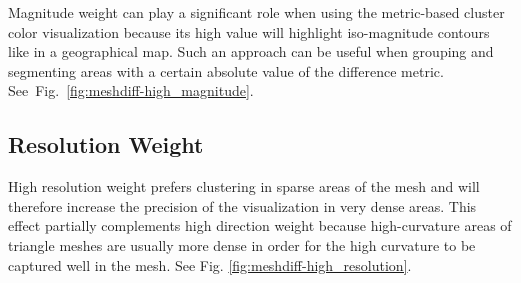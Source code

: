 Magnitude weight can play a significant role when using the metric-based cluster color visualization because its high value will highlight iso-magnitude contours like in a geographical map. Such an approach can be useful when grouping and segmenting areas with a certain absolute value of the difference metric. See~Fig.~\ref{fig:meshdiff-high_magnitude}.
\subsection{Resolution Weight}
\label{subsec:analysis-parameter_effect-resolution}

High resolution weight prefers clustering in sparse areas of the mesh and will therefore increase the precision of the visualization in very dense areas. This effect partially complements high direction weight because high-curvature areas of triangle meshes are usually more dense in order for the high curvature to be captured well in the mesh. See Fig. \ref{fig:meshdiff-high_resolution}.

